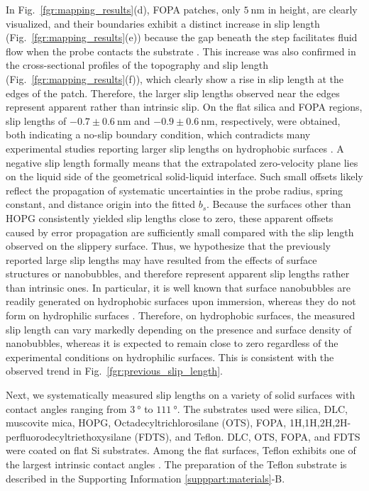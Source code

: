 \documentclass[journal=jacsat,manuscript=article]{achemso}
\newcommand{\ChangeTagStart}[1]{\linelabel{changetag:start:#1}}
\newcommand{\ChangeTagEnd}[1]{\linelabel{changetag:end:#1}}
\begin{document}
In Fig.~\ref{fgr:mapping_results}(d), FOPA patches, only \(\SI{5}{\nano\metre}\) in height, are clearly visualized, and their boundaries exhibit a distinct increase in slip length (Fig.~\ref{fgr:mapping_results}(e)) because the gap beneath the step facilitates fluid flow when the probe contacts the substrate \cite{Ybert2007-jv}. This increase was also confirmed in the cross-sectional profiles of the topography and slip length (Fig.~\ref{fgr:mapping_results}(f)), which clearly show a rise in slip length at the edges of the patch. Therefore, the larger slip lengths observed near the edges represent apparent rather than intrinsic slip. On the flat silica and FOPA regions, slip lengths of \(-0.7 \pm \SI{0.6}{\nano\metre}\) and \(-0.9 \pm \SI{0.6}{\nano\metre}\), respectively, were obtained, both indicating a no-slip boundary condition, which contradicts many experimental studies reporting larger slip lengths on hydrophobic surfaces \cite{Tretheway2002-et, Cho2004-it, Bouzigues2008-xn, Cottin-Bizonne2008-nc, Lasne2008-qt, Bhushan2009-yz, Jing2013-kn, Zhang2021-tn, Li2022-qs, Han2025-qq}. \ChangeTagStart{r2_8_negative_slip}A negative slip length formally means that the extrapolated zero-velocity plane lies on the liquid side of the geometrical solid-liquid interface. Such small offsets likely reflect the propagation of systematic uncertainties in the probe radius, spring constant, and distance origin into the fitted \(b_s\). Because the surfaces other than HOPG consistently yielded slip lengths close to zero, these apparent offsets caused by error propagation are sufficiently small compared with the slip length observed on the slippery surface.\ChangeTagEnd{r2_8_negative_slip} Thus, we hypothesize that the previously reported large slip lengths may have resulted from the effects of surface structures or nanobubbles, and therefore represent apparent slip lengths rather than intrinsic ones. In particular, it is well known that surface nanobubbles are readily generated on hydrophobic surfaces upon immersion, whereas they do not form on hydrophilic surfaces \cite{Yang2003-mh, Agrawal2005-oo}. Therefore, on hydrophobic surfaces, the measured slip length can vary markedly depending on the presence and surface density of nanobubbles, whereas it is expected to remain close to zero regardless of the experimental conditions on hydrophilic surfaces. This is consistent with the observed trend in Fig.~\ref{fgr:previous_slip_length}.

Next, we systematically measured slip lengths on a variety of solid surfaces with contact angles ranging from \(\SI{3}{\degree}\) to \(\SI{111}{\degree}\). The substrates used were silica, DLC, muscovite mica, HOPG, Octadecyltrichlorosilane (OTS), FOPA, 1H,1H,2H,2H-perfluorodecyltriethoxysilane (FDTS), and Teflon. DLC, OTS, FOPA, and FDTS were coated on flat Si substrates. Among the flat surfaces, Teflon exhibits one of the largest intrinsic contact angles \cite{Sas2012-bl, Crick2010-zw}. The preparation of the Teflon substrate is described in the Supporting Information \ref{supppart:materials}-B.
\end{document}
